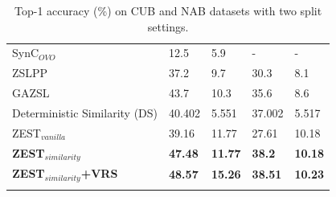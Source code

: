 \documentclass[11pt,a4paper]{article}
\begin{document}
\begin{table}[t]
{\begin{tabular}{l|ll|ll}
SynC$_{OVO}$ \citet{changpinyo2016synthesized}      & 12.5                              & 5.9                                & -                                 & -                                  \\
ZSLPP \citet{elhoseiny2017link}                   & 37.2                              & 9.7                                & 30.3                              & 8.1                                \\
GAZSL \citet{zhu2018generative}                   & 43.7                              & 10.3                               & 35.6                              & 8.6                                \\ 
\hline
Deterministic Similarity (DS) & 40.402                            & 5.551                              & 37.002                            & 5.517                              \\
ZEST$_{vanilla}$                                                                 & 39.16                            & 11.77                             & 27.61                            & 10.18                             \\
\textbf{ZEST$_{similarity}$}                                           & \textbf{47.48}                   & \textbf{11.77}                     & \textbf{38.2}                   & \textbf{10.18}                    \\
\hline
\textbf{ZEST$_{similarity}$+VRS}                                        & \textbf{48.57}                    & \textbf{15.26}                    & \textbf{38.51 }                   & \textbf{10.23 }                    \\ 
\Xhline{6\arrayrulewidth}
                 
\end{tabular}
}
\caption{Top-1 accuracy (\%) on CUB and NAB datasets with two split settings.}
\label{tab:results}
\end{table}
\end{document}
